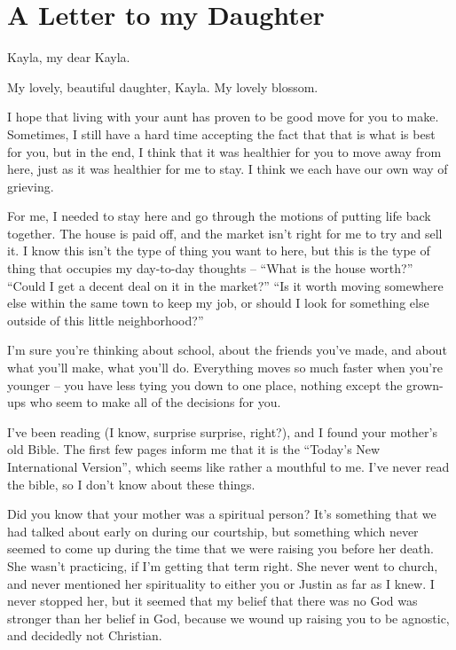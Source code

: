 \chapter{A Letter to my Daughter}

\begin{itshape}
Kayla, my dear Kayla.

My lovely, beautiful daughter, Kayla.  My lovely blossom.

I hope that living with your aunt has proven to be good move for you to make.  Sometimes, I still have a hard time accepting the fact that that is what is best for you, but in the end, I think that it was healthier for you to move away from here, just as it was healthier for me to stay.  I think we each have our own way of grieving.

For me, I needed to stay here and go through the motions of putting life back together.  The house is paid off, and the market isn't right for me to try and sell it.  I know this isn't the type of thing you want to here, but this is the type of thing that occupies my day-to-day thoughts -- ``What is the house worth?''  ``Could I get a decent deal on it in the market?''  ``Is it worth moving somewhere else within the same town to keep my job, or should I look for something else outside of this little neighborhood?''

I'm sure you're thinking about school, about the friends you've made, and about what you'll make, what you'll do.  Everything moves so much faster when you're younger -- you have less tying you down to one place, nothing except the grown-ups who seem to make all of the decisions for you.

I've been reading (I know, surprise surprise, right?), and I found your mother's old Bible.  The first few pages inform me that it is the ``Today's New International Version'', which seems like rather a mouthful to me.  I've never read the bible, so I don't know about these things.

Did you know that your mother was a spiritual person?  It's something that we had talked about early on during our courtship, but something which never seemed to come up during the time that we were raising you before her death.  She wasn't practicing, if I'm getting that term right.  She never went to church, and never mentioned her spirituality to either you or Justin as far as I knew.  I never stopped her, but it seemed that my belief that there was no God was stronger than her belief in God, because we wound up raising you to be agnostic, and decidedly not Christian.


\end{itshape}
